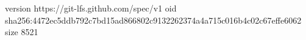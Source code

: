 version https://git-lfs.github.com/spec/v1
oid sha256:4472ec5ddb792c7bd15ad866802c9132262374a4a715c016b4c02c67effe6062
size 8521
